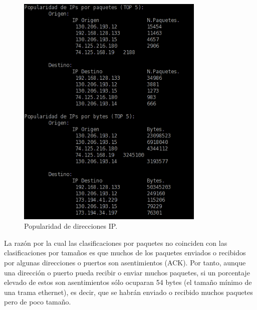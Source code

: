 \documentclass[a4paper, 11pt]{article}	%
\begin{document}
\begin{figure}[H]
\centering
\includegraphics[width=0.8\textwidth]{popularidadIP.png}
\caption{Popularidad de direcciones IP.}
\label{fig:popIP}
\end{figure}

La razón por la cual las clasificaciones por paquetes no coinciden con las clasificaciones por tamaños es que muchos de los paquetes enviados o recibidos por algunas direcciones o puertos son asentimientos (ACK). Por tanto, aunque una dirección o puerto pueda recibir o enviar muchos paquetes, si un porcentaje elevado de estos son asentimientos sólo ocuparan 54 bytes (el tamaño mínimo de una trama ethernet), es decir, que se habrán enviado o recibido muchos paquetes pero de poco tamaño.
\end{document}
